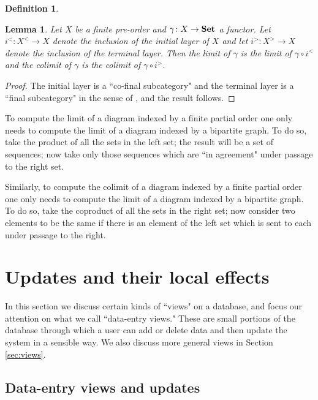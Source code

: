 \documentclass{amsart}
\def\to{\rightarrow}
\def\taking{\colon}
\def\Set{{\bf Set}}
\newtheorem{lemma}[theorem]{Lemma}
\theoremstyle{remark}
\theoremstyle{definition}
\newtheorem{definition}[theorem]{Definition}
\begin{document}
{\begin{definition}
\end{definition}

\begin{lemma}

Let $X$ be a finite pre-order and $\gamma\taking X\to\Set$ a functor.  Let $i^<\taking X^<\to X$ denote the inclusion of the initial layer of $X$ and let $i^>\taking X^>\to X$ denote the inclusion of the terminal layer.  Then the limit of $\gamma$ is the limit of $\gamma\circ i^<$ and the colimit of $\gamma$ is the colimit of $\gamma\circ i^>$. 

\end{lemma}

\begin{proof}

The initial layer is a ``co-final subcategory" and the terminal layer is a ``final subcategory" in the sense of \cite[]{}, and the result follows.

\end{proof}

To compute the limit of a diagram indexed by a finite partial order one only needs to compute the limit of a diagram indexed by a bipartite graph.  To do so, take the product of all the sets in the left set; the result will be a set of sequences; now take only those sequences which are ``in agreement" under passage to the right set.

Similarly, to compute the colimit of a diagram indexed by a finite partial order one only needs to compute the limit of a diagram indexed by a bipartite graph.  To do so, take the coproduct of all the sets in the right set; now consider two elements to be the same if there is an element of the left set which is sent to each under passage to the right.

}%

\section{Updates and their local effects}\label{sec:updates-local}

In this section we discuss certain kinds of ``views" on a database, and focus our attention on what we call ``data-entry views."  These are small portions of the database through which a user can add or delete data and then update the system in a sensible way.  We also discuss more general views in Section \ref{sec:views}.

\subsection{Data-entry views and updates}\label{sec:data-entry}
\end{document}
